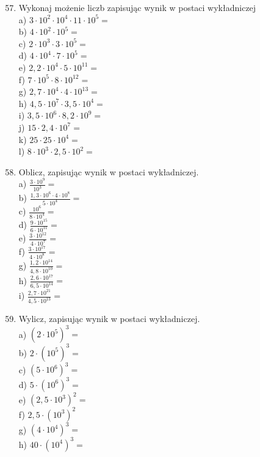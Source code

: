 \documentclass[10pt]{article}
\begin{document}
\begin{enumerate}
  \setcounter{enumi}{56}
  \item Wykonaj możenie liczb zapisując wynik w postaci wykładniczej\\
a) \(3 \cdot 10^{2} \cdot 10^{4} \cdot 11 \cdot 10^{5}=\)\\
b) \(4 \cdot 10^{2} \cdot 10^{5}=\)\\
c) \(2 \cdot 10^{3} \cdot 3 \cdot 10^{5}=\)\\
d) \(4 \cdot 10^{4} \cdot 7 \cdot 10^{5}=\)\\
e) \(2,2 \cdot 10^{4} \cdot 5 \cdot 10^{11}=\)\\
f) \(7 \cdot 10^{5} \cdot 8 \cdot 10^{12}=\)\\
g) \(2,7 \cdot 10^{4} \cdot 4 \cdot 10^{13}=\)\\
h) \(4,5 \cdot 10^{7} \cdot 3,5 \cdot 10^{4}=\)\\
i) \(3,5 \cdot 10^{6} \cdot 8,2 \cdot 10^{9}=\)\\
j) \(15 \cdot 2,4 \cdot 10^{7}=\)\\
k) \(25 \cdot 25 \cdot 10^{4}=\)\\
l) \(8 \cdot 10^{3} \cdot 2,5 \cdot 10^{2}=\)
  \item Oblicz, zapisując wynik w postaci wykładniczej.\\
a) \(\frac{3 \cdot 10^{9}}{10^{3}}=\)\\
b) \(\frac{1,3 \cdot 10^{6} \cdot 4 \cdot 10^{8}}{5 \cdot 10^{4}}=\)\\
c) \(\frac{10^{6}}{8 \cdot 10^{4}}=\)\\
d) \(\frac{9 \cdot 10^{15}}{6 \cdot 10^{11}}=\)\\
e) \(\frac{3 \cdot 10^{12}}{4 \cdot 10^{7}}=\)\\
f) \(\frac{3 \cdot 10^{17}}{4 \cdot 10^{8}}=\)\\
g) \(\frac{1,2 \cdot 10^{14}}{4,8 \cdot 10^{10}}=\)\\
h) \(\frac{2,6 \cdot 10^{17}}{6,5 \cdot 10^{14}}=\)\\
i) \(\frac{2,7 \cdot 10^{21}}{4,5 \cdot 10^{13}}=\)
  \item Wylicz, zapisując wynik w postaci wykładniczej.\\
a) \(\left(2 \cdot 10^{5}\right)^{3}=\)\\
b) \(2 \cdot\left(10^{5}\right)^{3}=\)\\
c) \(\left(5 \cdot 10^{6}\right)^{3}=\)\\
d) \(5 \cdot\left(10^{6}\right)^{3}=\)\\
e) \(\left(2,5 \cdot 10^{3}\right)^{2}=\)\\
f) \(2,5 \cdot\left(10^{3}\right)^{2}\)\\
g) \(\left(4 \cdot 10^{4}\right)^{3}=\)\\
h) \(40 \cdot\left(10^{4}\right)^{3}=\)
\end{enumerate}
\end{document}
